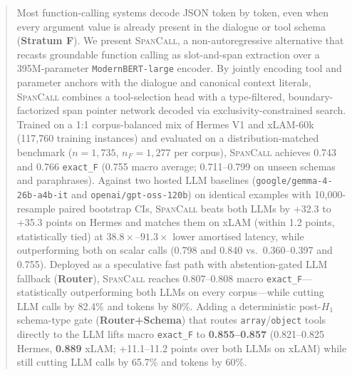 \begin{abstract}
Most function-calling systems decode JSON token by token, even when every argument value is already present in the dialogue or tool schema (\textbf{Stratum F}). We present \textsc{SpanCall}, a non-autoregressive alternative that recasts groundable function calling as slot-and-span extraction over a 395M-parameter \texttt{ModernBERT-large} encoder. By jointly encoding tool and parameter anchors with the dialogue and canonical context literals, \textsc{SpanCall} combines a tool-selection head with a type-filtered, boundary-factorized span pointer network decoded via exclusivity-constrained search. Trained on a 1:1 corpus-balanced mix of Hermes V1 and xLAM-60k (117,760 training instances) and evaluated on a distribution-matched benchmark ($n{=}1{,}735$, $n_F{=}1{,}277$ per corpus), \textsc{SpanCall} achieves 0.743 and 0.766 \texttt{exact\_F} (0.755 macro average; 0.711--0.799 on unseen schemas and paraphrases). Against two hosted LLM baselines (\texttt{google/gemma-4-26b-a4b-it} and \texttt{openai/gpt-oss-120b}) on identical examples with 10,000-resample paired bootstrap CIs, \textsc{SpanCall} beats both LLMs by +32.3 to +35.3 points on Hermes and matches them on xLAM (within 1.2 points, statistically tied) at $38.8\times$--$91.3\times$ lower amortised latency, while outperforming both on scalar calls (0.798 and 0.840 vs.\ 0.360--0.397 and 0.755). Deployed as a speculative fast path with abstention-gated LLM fallback (\textbf{Router}), \textsc{SpanCall} reaches 0.807--0.808 macro \texttt{exact\_F}---statistically outperforming both LLMs on every corpus---while cutting LLM calls by 82.4\% and tokens by 80\%. Adding a deterministic post-$H_1$ schema-type gate (\textbf{Router+Schema}) that routes \texttt{array}/\texttt{object} tools directly to the LLM lifts macro \texttt{exact\_F} to \textbf{0.855--0.857} (0.821--0.825 Hermes, \textbf{0.889} xLAM; +11.1--11.2 points over both LLMs on xLAM) while still cutting LLM calls by 65.7\% and tokens by 60\%.
\end{abstract}